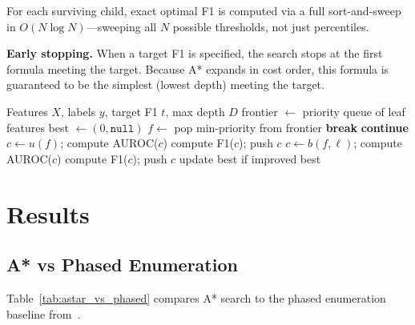 \documentclass[journal]{IEEEtran}
\begin{document}
For each surviving child, exact optimal F1 is computed via a full
sort-and-sweep in $O(N \log N)$---sweeping all $N$ possible thresholds,
not just percentiles.

\textbf{Early stopping.} When a target F1 is specified, the search
stops at the first formula meeting the target. Because A* expands in
cost order, this formula is guaranteed to be the simplest (lowest depth)
meeting the target.

\begin{algorithm}[t]
\caption{A* Formula Search with Provable Pruning}
\label{alg:astar}
\begin{algorithmic}[1]
\Require Features $X$, labels $y$, target F1 $t$, max depth $D$
\State frontier $\gets$ priority queue of leaf features
\State best $\gets (0, \texttt{null})$
    \State $f \gets$ pop min-priority from frontier
        \State \textbf{break} 
    \EndIf
     \textbf{continue} \EndIf
        \State $c \gets u(f)$; compute AUROC($c$)
            compute F1($c$); push $c$
        \EndIf
    \EndFor
        \State $c \gets b(f, \ell)$; compute AUROC($c$)
            compute F1($c$); push $c$
        \EndIf
    \EndFor
    \State update best if improved
\EndWhile
\State \Return best
\end{algorithmic}
\end{algorithm}

\section{Results}

\subsection{A* vs Phased Enumeration}

Table~\ref{tab:astar_vs_phased} compares A* search to the phased
enumeration baseline from~\cite{bond2026phased}.
\end{document}
